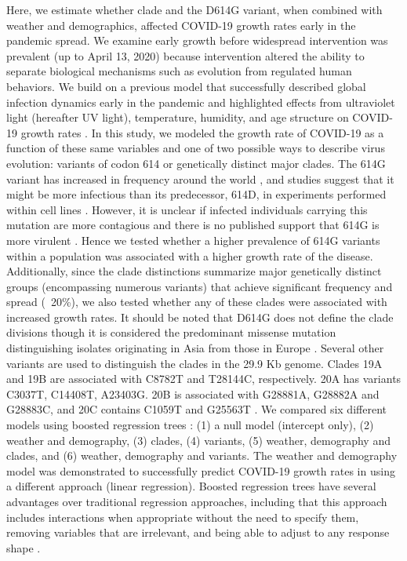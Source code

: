 \documentclass[9pt,twocolumn,twoside,lineno]{pnas-new}
\begin{document}
Here, we estimate whether clade and the D614G variant, when combined with weather and demographics, affected COVID-19 growth rates early in the pandemic spread. We examine early growth before widespread intervention was prevalent (up to April 13, 2020) because intervention altered the ability to separate biological mechanisms such as evolution from regulated human behaviors. We build on a previous model that successfully described global infection dynamics early in the pandemic and highlighted effects from ultraviolet light (hereafter UV light), temperature, humidity, and age structure on COVID-19 growth rates \cite{Merow2020-be}. In this study, we modeled the growth rate of COVID-19 as a function of these same variables and one of two possible ways to describe virus evolution: variants of codon 614 or genetically distinct major clades. The 614G variant has increased in frequency around the world \cite{Korber2020-ub}, and studies suggest that it might be more infectious than its predecessor, 614D, in experiments performed within cell lines \cite{Korber2020-ub, Li2020-vu}. However, it is unclear if infected individuals carrying this mutation are more contagious and there is no published support that 614G is more virulent \cite{Grubaugh2020-ps}. Hence we tested whether a higher prevalence of 614G variants within a population was associated with a higher growth rate of the disease. Additionally, since the clade distinctions summarize major genetically distinct groups (encompassing numerous variants) that achieve significant frequency and spread (~20\%), we also tested whether any of these clades were associated with increased growth rates. It should be noted that D614G does not define the clade divisions though it is considered the predominant missense mutation distinguishing isolates originating in Asia from those in Europe \cite{Korber2020-ub}. Several other variants are used to distinguish the clades in the 29.9 Kb genome. Clades 19A and 19B are associated with C8782T and T28144C, respectively. 20A has variants C3037T, C14408T, A23403G. 20B is associated with G28881A, G28882A and G28883C, and 20C contains C1059T and G25563T \cite{Nextclade_2020}. We compared six different models using boosted regression trees \cite{Friedman2001-vj, Friedman2008-ep}: (1) a null model (intercept only), (2) weather and demography, (3) clades, (4) variants, (5) weather, demography and clades, and (6) weather, demography and variants. The weather and demography model was demonstrated to successfully predict COVID-19 growth rates in \cite{Merow2020-be} using a different approach (linear regression). Boosted regression trees have several advantages over traditional regression approaches, including that this approach includes interactions when appropriate without the need to specify them, removing variables that are irrelevant, and being able to adjust to any response shape \cite{Friedman2001-vj, Friedman2008-ep, Elith2008-vq}.
\end{document}
